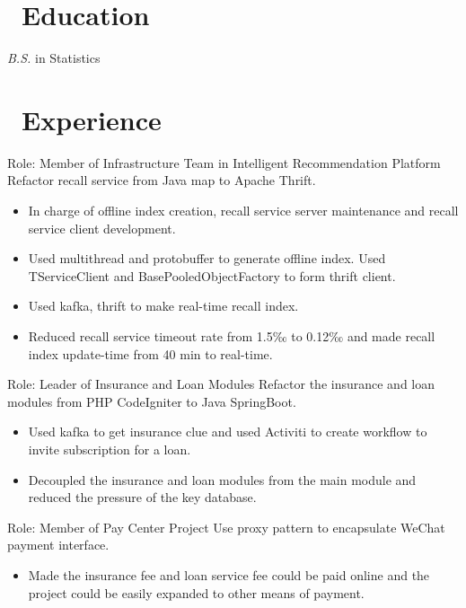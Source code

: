 \documentclass{resume}
\begin{document}



\section{\faGraduationCap\ Education}
\textit{B.S.} in Statistics

\section{\faUsers\ Experience}
Role: Member of Infrastructure Team in Intelligent Recommendation Platform
\newline Refactor recall service from Java map to Apache Thrift.
\begin{itemize}
  \item In charge of offline index creation, recall service server maintenance and recall service client development.
  \item Used multithread and protobuffer to generate offline index. Used TServiceClient and BasePooledObjectFactory to form thrift client.
  \item Used kafka, thrift to make real-time recall index.
  \item Reduced recall service timeout rate from 1.5‰ to 0.12‰ and made recall index update-time from 40 min to real-time.
\end{itemize}

Role: Leader of Insurance and Loan Modules
\newline Refactor the insurance and loan modules from PHP CodeIgniter to Java SpringBoot.
\begin{itemize}
  \item Used kafka to get insurance clue and used Activiti to create workflow to invite subscription for a loan.
  \item Decoupled the insurance and loan modules from the main module and reduced the pressure of the key database.
\end{itemize}

Role: Member of Pay Center Project
\newline Use proxy pattern to encapsulate WeChat payment interface.
\begin{itemize}
  \item Made the insurance fee and loan service fee could be paid online and the project could be easily expanded to other means of payment.
\end{itemize}
\end{document}
